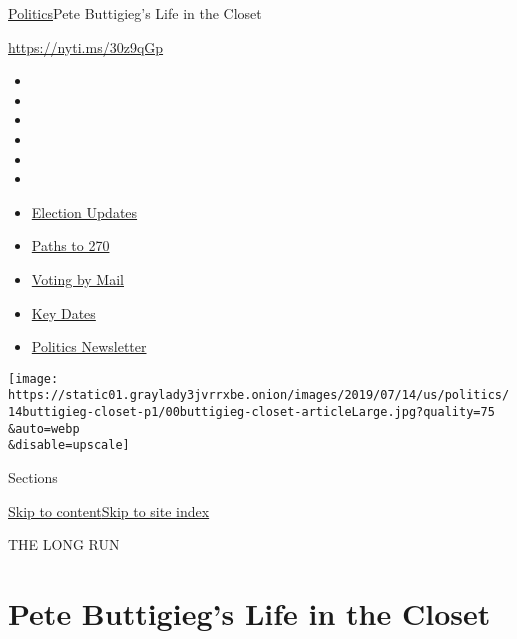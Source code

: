 \href{/section/politics}{Politics}\textbar{}Pete Buttigieg's Life in the
Closet

\url{https://nyti.ms/30z9qGp}

\begin{itemize}
\item
\item
\item
\item
\item
\item
\end{itemize}

\begin{itemize}
\item
  \href{https://www.nytimes3xbfgragh.onion/live/2020/09/08/us/trump-vs-biden?action=click\&pgtype=Article\&state=default\&region=TOP_BANNER\&context=storylines_menu}{Election
  Updates}
\item
  \href{https://www.nytimes3xbfgragh.onion/interactive/2020/us/elections/election-states-biden-trump.html?action=click\&pgtype=Article\&state=default\&region=TOP_BANNER\&context=storylines_menu}{Paths
  to 270}
\item
  \href{https://www.nytimes3xbfgragh.onion/interactive/2020/08/31/us/politics/vote-by-mail-deadlines.html?action=click\&pgtype=Article\&state=default\&region=TOP_BANNER\&context=storylines_menu}{Voting
  by Mail}
\item
  \href{https://www.nytimes3xbfgragh.onion/interactive/2019/us/elections/2020-presidential-election-calendar.html?action=click\&pgtype=Article\&state=default\&region=TOP_BANNER\&context=storylines_menu}{Key
  Dates}
\item
  \href{https://www.nytimes3xbfgragh.onion/newsletters/politics?action=click\&pgtype=Article\&state=default\&region=TOP_BANNER\&context=storylines_menu}{Politics
  Newsletter}
\end{itemize}

\texttt{[image: https://static01.graylady3jvrrxbe.onion/images/2019/07/14/us/politics/14buttigieg-closet-p1/00buttigieg-closet-articleLarge.jpg?quality=75\\\&auto=webp\\\&disable=upscale]}

Sections

\protect\hyperlink{site-content}{Skip to
content}\protect\hyperlink{site-index}{Skip to site index}

THE LONG RUN

\hypertarget{pete-buttigiegs-life-in-the-closet}{%
\section{Pete Buttigieg's Life in the
Closet}\label{pete-buttigiegs-life-in-the-closet}}

